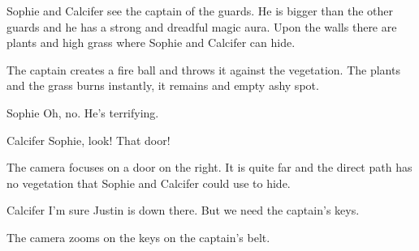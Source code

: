 \begin{screenplay}

Sophie and Calcifer see the captain of the guards. He is bigger than the other guards and he has a strong and dreadful magic aura. Upon the walls there are plants and high grass where Sophie and Calcifer can hide.

The captain creates a fire ball and throws it against the vegetation. The plants and the grass burns instantly, it remains and empty ashy spot.

\begin{dialogue}{Sophie}
Oh, no. He's terrifying.
\end{dialogue}

\begin{dialogue}{Calcifer}
Sophie, look! That door!
\end{dialogue}

The camera focuses on a door on the right. It is quite far and the direct path has no vegetation that Sophie and Calcifer could use to hide.

\begin{dialogue}[continuing]{Calcifer}
I'm sure Justin is down there. But we need the captain's keys.
\end{dialogue}

The camera zooms on the keys on the captain's belt.

\end{screenplay}
\vspace{1em}

